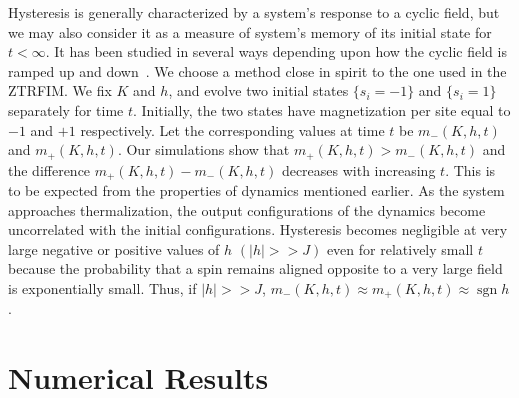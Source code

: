 \documentclass[a4,aps,amsmath,floatfix,nofootinbib,10pt]{revtex4}
\newcommand{\sgn}{\operatorname{sgn}}
\begin{document}
Hysteresis is generally characterized by a system's response to a 
cyclic field, but we may also consider it as a measure of system's 
memory of its initial state for $t < \infty$. It has been studied in 
several ways depending upon how the cyclic field is ramped up and 
down~\cite{rao, samoza, thomas, zheng}. We choose a method close in 
spirit to the one used in the ZTRFIM. We fix $K$ and $h$, and evolve 
two initial states $\{s_i=-1\}$ and $\{s_i=1\}$ separately for time 
$t$. Initially, the two states have magnetization per site equal to 
$-1$ and $+1$ respectively. Let the corresponding values at time $t$ be 
$m_-(K,h,t)$ and $m_+(K,h,t)$. Our simulations show that $m_+(K,h,t) > 
m_-(K,h,t)$ and the difference $m_+(K,h,t) - m_-(K,h,t)$ decreases with 
increasing $t$. This is to be expected from the properties of dynamics 
mentioned earlier. As the system approaches thermalization, the output 
configurations of the dynamics become uncorrelated with the initial 
configurations. Hysteresis becomes negligible at very large negative or 
positive values of $h$ $(|h| >> J)$ even for relatively small $t$ 
because the probability that a spin remains aligned opposite to a very 
large field is exponentially small. Thus, if $|h| >> J$, 
$m_-(K,h,t)\approx m_+(K,h,t)\approx \sgn h$.

\section{Numerical Results}
\end{document}
